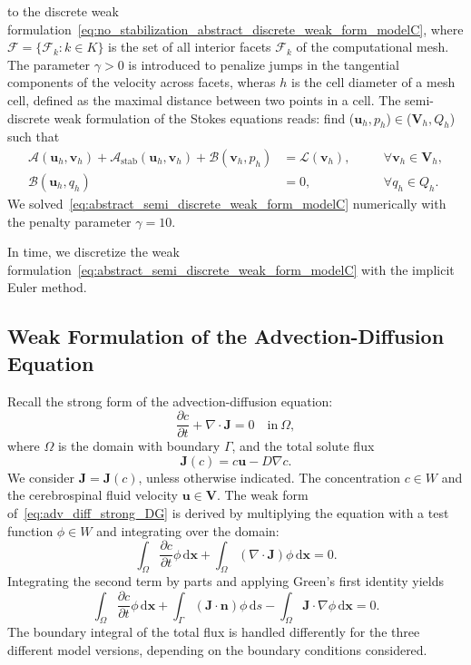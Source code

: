 \documentclass[fleqn]{wlscirep}
\newcommand{\pdifft}[1]{\frac{\partial  #1}{\partial t}}
\newcommand{\intO}[1]{\int_{\Omega}#1 \, \mathrm d\bm{x}}
\newcommand{\intG}[1]{\int_{\Gamma}#1 \, \mathrm ds}
\newcommand{\nn}{\mathbf{n}}
\newcommand{\uu}{\mathbf{u}}
\newcommand{\vv}{\mathbf{v}}
\newcommand{\JJ}{\mathbf{J}}
\newcommand{\VV}{\mathbf{V}}
\begin{document}
to the discrete weak  formulation~\eqref{eq:no_stabilization_abstract_discrete_weak_form_modelC}, where $\mathcal{F} = \{\mathcal{F}_k : k\in K\}$ is the set of all interior facets $\mathcal{F}_k$ of the computational mesh. The parameter $\gamma>0$ is introduced to penalize jumps in the tangential components of the velocity across facets, wheras $h$ is the cell diameter of a mesh cell, defined as the maximal distance between two points in a cell. The semi-discrete weak formulation of the Stokes equations reads: find ($\uu_h, p_h$)$\in$($\VV_h, Q_h$) such that
\begin{subequations}
    \begin{alignat}{2}
        \mathcal{A}(\uu_h, \vv_h) + \mathcal{A}_{\mathrm{stab}}(\uu_h, \vv_h) + \mathcal{B}(\vv_h, p_h) &= \mathcal{L}(\vv_h), &&\quad\forall\vv_h\in\VV_h, \\
        \mathcal{B}(\uu_h, q_h) &= 0, &&\quad\forall q_h\in Q_h.
    \end{alignat}%
    \label{eq:abstract_semi_discrete_weak_form_modelC}%
\end{subequations}%
We solved~\eqref{eq:abstract_semi_discrete_weak_form_modelC} numerically with the penalty parameter $\gamma=10$.

In time, we discretize the weak formulation~\eqref{eq:abstract_semi_discrete_weak_form_modelC} with the implicit Euler method.

\subsection{Weak Formulation of the Advection-Diffusion Equation}
Recall the strong form of the advection-diffusion equation:
\begin{equation}
    \pdifft{c} + \nabla\cdot\JJ = 0 \quad\mathrm{in} \ \Omega,
    \label{eq:adv_diff_strong_DG}
\end{equation}
where $\Omega$ is the domain with boundary $\Gamma$, and the total solute flux
\begin{equation*}
    \JJ(c) = c\uu - D\nabla c.
\end{equation*}
We consider $\JJ = \JJ(c)$, unless otherwise indicated. The concentration $c\in W$ and the cerebrospinal fluid velocity $\uu\in\VV$. The weak form of~\eqref{eq:adv_diff_strong_DG} is derived by multiplying the equation with a test function $\phi \in W$ and integrating over the domain: 
\begin{equation*}
    \intO{\pdifft{c}\phi} + \intO{(\nabla\cdot\JJ)\phi} = 0.
\end{equation*}
Integrating the second term by parts and applying Green's first identity yields
\begin{equation}
    \intO{\pdifft{c}\phi} + \intG{(\JJ\cdot\nn)\phi} - \intO{\JJ\cdot\nabla\phi} = 0.\label{eq:adv_diff_weak_formA1}
\end{equation}
The boundary integral of the total flux is handled differently for the three different model versions, depending on the boundary conditions considered.
\end{document}
